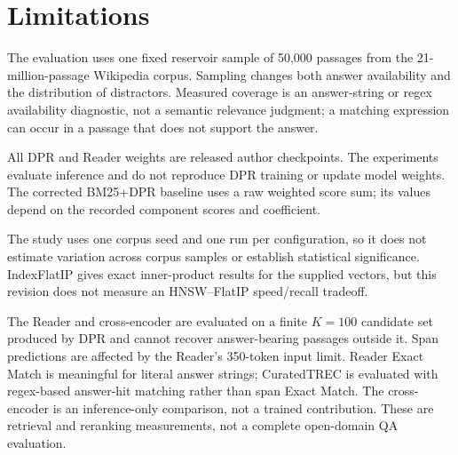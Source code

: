 \section{Limitations}
The evaluation uses one fixed reservoir sample of 50,000 passages from the 21-million-passage Wikipedia corpus. Sampling changes both answer availability and the distribution of distractors. Measured coverage is an answer-string or regex availability diagnostic, not a semantic relevance judgment; a matching expression can occur in a passage that does not support the answer.

All DPR and Reader weights are released author checkpoints. The experiments evaluate inference and do not reproduce DPR training or update model weights. The corrected BM25+DPR baseline uses a raw weighted score sum; its values depend on the recorded component scores and coefficient.

The study uses one corpus seed and one run per configuration, so it does not estimate variation across corpus samples or establish statistical significance. IndexFlatIP gives exact inner-product results for the supplied vectors, but this revision does not measure an HNSW--FlatIP speed/recall tradeoff.

The Reader and cross-encoder are evaluated on a finite $K=100$ candidate set produced by DPR and cannot recover answer-bearing passages outside it. Span predictions are affected by the Reader's 350-token input limit. Reader Exact Match is meaningful for literal answer strings; CuratedTREC is evaluated with regex-based answer-hit matching rather than span Exact Match. The cross-encoder is an inference-only comparison, not a trained contribution. These are retrieval and reranking measurements, not a complete open-domain QA evaluation.
